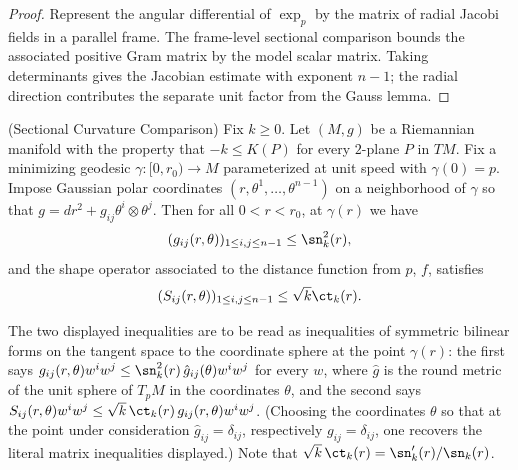 \begin{proof}
\sketch
{}
\leanok
Represent the angular differential of $\exp_p$ by the matrix of radial Jacobi fields in a parallel frame. The frame-level sectional comparison bounds the associated positive Gram matrix by the model scalar matrix. Taking determinants gives the Jacobian estimate with exponent $n-1$; the radial direction contributes the separate unit factor from the Gauss lemma.
\end{proof}


\begin{theorem}
\label{thm:sectional-curvature-comparison}
\label{SCC}



(Sectional Curvature Comparison) Fix $k\ge 0$. Let $(M, g)$ be a
Riemannian manifold with the property that $-k \leq K(P)$ for every
$2$-plane $P$ in $TM$. Fix a minimizing geodesic $\gamma\colon
[0,r_0)\to M$ parameterized at unit speed with $\gamma(0)=p$. Impose
Gaussian polar coordinates $(r,\theta^1,\ldots,\theta^{n-1})$ on a
neighborhood of $\gamma$ so that $g=dr^2+g_{ij}\theta^i\otimes
\theta^j$. Then for all $0<r<r_0$, at $\gamma(r)$ we have
$$ (g_{ij}(r,\theta))_{1 \leq
i,j \leq n-1} \leq \sn_{k}^{2}(r),$$ and the shape operator
associated to  the distance function from $p$, $f$, satisfies
$$(S_{ij}(r,\theta))_{1 \leq i,j \leq n-1} \leq \sqrt{k}\ct_{k}(r).$$
\end{theorem}

The two displayed inequalities are to be read as inequalities of
symmetric bilinear forms on the tangent space to the coordinate
sphere at the point $\gamma(r)$: the first says $g_{ij}(r,\theta)w^iw^j\le
\sn_k^2(r)\,\hat g_{ij}(\theta)w^iw^j$ for every $w$, where $\hat g$
is the round metric of the unit sphere of $T_pM$ in the coordinates
$\theta$, and the second says $S_{ij}(r,\theta)w^iw^j\le
\sqrt{k}\,\ct_k(r)\,g_{ij}(r,\theta)w^iw^j$. (Choosing the
coordinates $\theta$ so that at the point under consideration
$\hat g_{ij}=\delta_{ij}$, respectively $g_{ij}=\delta_{ij}$, one
recovers the literal matrix inequalities displayed.) Note that
$\sqrt k\,\ct_k(r)=\sn_k'(r)/\sn_k(r)$.

